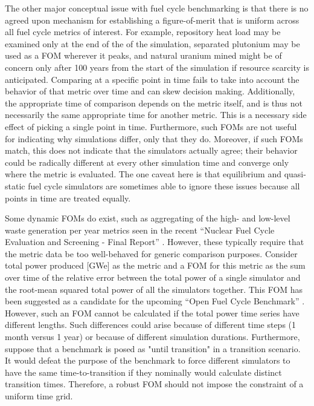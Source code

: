 The other major conceptual issue with fuel cycle benchmarking is that there 
is no agreed upon mechanism for establishing a figure-of-merit
that is uniform across all fuel cycle metrics of interest. For example, 
repository heat load may be examined only at the end of the of the simulation,
separated plutonium may be used as a FOM wherever it peaks, and natural uranium 
mined might be of concern only after 100 years from the start of the 
simulation if resource scarcity is anticipated. Comparing at a specific point 
in time fails to take into account the behavior of that metric over time and 
can skew decision making. Additionally, the appropriate 
time of comparison depends on the metric itself, and is thus not necessarily 
the same appropriate time for another metric. This is a necessary 
side effect of picking a single point in time.
Furthermore, such FOMs are not useful for indicating why simulations differ, 
only that they do. Moreover, if such FOMs match, this does not indicate
that the simulators actually agree; their behavior 
could be radically different at every other simulation time and converge
only where the metric is evaluated.  The one caveat 
here is that 
equilibrium and quasi-static fuel cycle simulators are sometimes able to 
ignore these issues because all points in time are treated equally.

Some dynamic FOMs do exist, such as aggregating of the high- and low-level
waste generation per year metrics seen in the recent 
``Nuclear Fuel Cycle Evaluation and Screening - Final Report'' 
\cite{wigeland2014nuclear}. However, these typically require that the metric
data be too well-behaved for generic comparison purposes. Consider  
total power produced [GWe] as the metric and a FOM for this metric as 
the sum over time of the relative error 
between the total power of a single simulator and the root-mean squared 
total power of all the simulators together. This FOM has been suggested as
a candidate for the upcoming ``Open Fuel Cycle Benchmark'' 
\cite{mouginot2015ofcb}. However, such an FOM cannot be calculated 
if the total power
time series have different lengths. Such differences could arise because 
of different time steps (1 month versus 1 year) or because of different 
simulation durations. Furthermore, suppose that a benchmark is posed as 
"until transition" in a transition scenario. It would defeat the purpose of 
the benchmark to force different simulators to have the same 
time-to-transition if they nominally would calculate distinct transition 
times. Therefore, a robust FOM should not impose the constraint of a uniform time grid.
 
